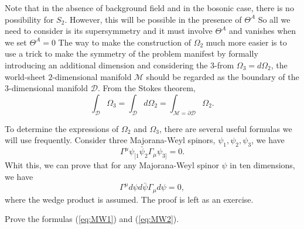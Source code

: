 \documentclass[graybox,envcountchap,sectrefs]{svmono}
\begin{document}
Note that in the absence of background field and in the bosonic case, there is no possibility for $S_{2}$. However, this will be possible in the presence of $\Theta^{A}$
So all we need to consider is its supersymmetry and it must involve $\Theta^{A}$ and vanishes when we set $\Theta^{A}=0$
The way to make the construction of $\Omega_{2}$ much more easier is to use a trick to make the symmetry of the problem manifest by formally introducing an additional dimension and considering the 3-from $\Omega_{3}=d \Omega_{2}$, the world-sheet $2$-dimensional manifold $\mathcal{M}$ should be regarded as the boundary of the $3$-dimensional manifold $\mathcal{D}$. From the Stokes theorem, 
\begin{equation}
\int_{\mathcal{D}}\Omega_3=\int_{\mathcal{D}}d\Omega_2=\int_{\mathcal{M}=\partial \mathcal{D}}\Omega_2.  	
\end{equation}

To determine the expressions of $\Omega_2$ and $\Omega_3$, there are several useful formulas we will use frequently. Consider three Majorana-Weyl spinors, $\psi_1,\psi_2,\psi_3$, we have
\begin{equation}\label{eq:MW1}
\Gamma^{\mu}\psi_{[1}\bar{\psi}_2\Gamma_{\mu}\psi_{3]}=0.
\end{equation}
Whit this, we can prove that for any Majorana-Weyl spinor $\psi$ in ten dimensions, we have
\begin{equation}\label{eq:MW2}
\Gamma^{\mu}d\psi d\bar{\psi}\Gamma_{\mu}d\psi=0,
\end{equation}
where the wedge product is assumed.
The proof is left as an exercise.
\begin{exercise}
Prove the formulas 	(\ref{eq:MW1}) and (\ref{eq:MW2}).
\end{exercise}
\end{document}
